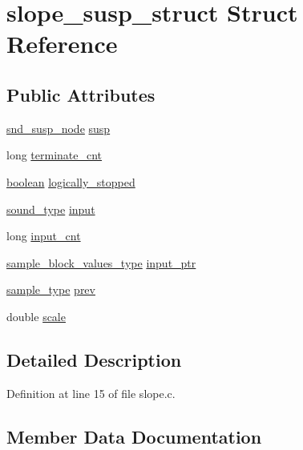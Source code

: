 \hypertarget{structslope__susp__struct}{}\section{slope\+\_\+susp\+\_\+struct Struct Reference}
\label{structslope__susp__struct}
\subsection*{Public Attributes}
\begin{DoxyCompactItemize}
\item 
\hyperlink{sound_8h_a6b268203688a934bd798ceb55f85d4c0}{snd\+\_\+susp\+\_\+node} \hyperlink{structslope__susp__struct_a4ec4a67f4a5e3f9c2314070e48fcd79c}{susp}
\item 
long \hyperlink{structslope__susp__struct_a579633a5410bb4df88e6ab943f19c706}{terminate\+\_\+cnt}
\item 
\hyperlink{cext_8h_a7670a4e8a07d9ebb00411948b0bbf86d}{boolean} \hyperlink{structslope__susp__struct_aa7b04c197e05cf39e81b3b0339e935a1}{logically\+\_\+stopped}
\item 
\hyperlink{sound_8h_a792cec4ed9d6d636d342d9365ba265ea}{sound\+\_\+type} \hyperlink{structslope__susp__struct_af7ffbcda3e6d0aade1db241dc8d1de09}{input}
\item 
long \hyperlink{structslope__susp__struct_abe886adf128d206b62abc4fe7a47767d}{input\+\_\+cnt}
\item 
\hyperlink{sound_8h_a83d17f7b465d1591f27cd28fc5eb8a03}{sample\+\_\+block\+\_\+values\+\_\+type} \hyperlink{structslope__susp__struct_ad6c0373c47fd81fcd221db156dc95c12}{input\+\_\+ptr}
\item 
\hyperlink{sound_8h_a3a9d1d4a1c153390d2401a6e9f71b32c}{sample\+\_\+type} \hyperlink{structslope__susp__struct_aae4e431c1e6aeeb7c9653165ea891b09}{prev}
\item 
double \hyperlink{structslope__susp__struct_a94cc5e05c174e8b91ceadc8d6701b431}{scale}
\end{DoxyCompactItemize}


\subsection{Detailed Description}


Definition at line 15 of file slope.\+c.



\subsection{Member Data Documentation}
